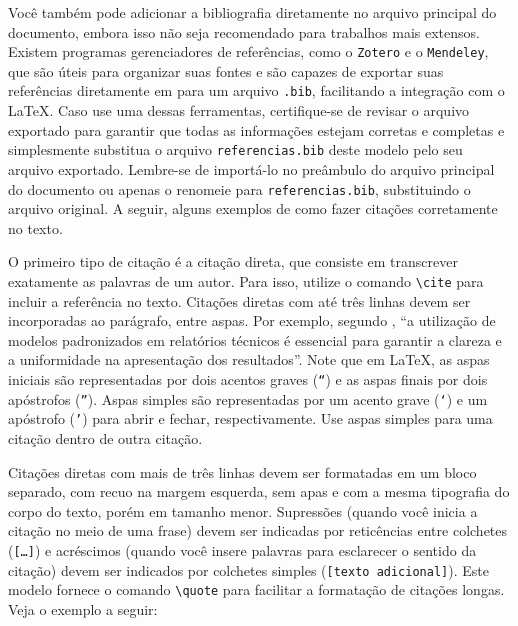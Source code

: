 Você também pode adicionar a bibliografia diretamente no arquivo principal do
documento, embora isso não seja recomendado para trabalhos mais extensos. Existem programas
gerenciadores de referências, como o \texttt{Zotero} e o \texttt{Mendeley}, que são úteis para
organizar suas fontes e são capazes de exportar suas referências diretamente em para um arquivo
\texttt{.bib}, facilitando a integração com o \LaTeX. Caso use uma dessas ferramentas, certifique-se
de revisar o arquivo exportado para garantir que todas as informações estejam corretas e completas e
simplesmente substitua o arquivo \texttt{referencias.bib} deste modelo pelo seu arquivo exportado.
Lembre-se de importá-lo no preâmbulo do arquivo principal do documento ou apenas o renomeie para
\texttt{referencias.bib}, substituindo o arquivo original. A seguir, alguns exemplos de como fazer citações corretamente no texto.

O primeiro tipo de citação é a citação direta, que consiste em transcrever exatamente as palavras de
um autor. Para isso, utilize o comando \texttt{\textbackslash cite} para incluir a referência no
texto. Citações diretas com até três linhas devem ser incorporadas ao parágrafo, entre aspas. Por
exemplo, segundo \textcite{fernandes2019}, ``a utilização de modelos padronizados em relatórios
técnicos é essencial para garantir a clareza e a uniformidade na apresentação dos resultados''. Note
que em \LaTeX, as aspas iniciais são representadas por dois acentos graves (\texttt{``}) e as aspas
finais por dois apóstrofos (\texttt{''}). Aspas simples são representadas por um acento grave
(\texttt{`}) e um apóstrofo (\texttt{'}) para abrir e fechar, respectivamente. Use aspas simples
para uma citação dentro de outra citação.

Citações diretas com mais de três linhas devem ser formatadas em um bloco separado, com recuo na
margem esquerda, sem apas e com a mesma tipografia do corpo do texto, porém em tamanho menor.
Supressões (quando você inicia a citação no meio de uma frase) devem ser indicadas por reticências entre colchetes
(\texttt{[\ldots]}) e acréscimos (quando você insere palavras para esclarecer o sentido da citação)
devem ser indicados por colchetes simples (\texttt{[texto adicional]}). Este modelo fornece o
comando \texttt{\textbackslash quote{}{}} para facilitar a formatação de citações longas. Veja o exemplo
a seguir:


